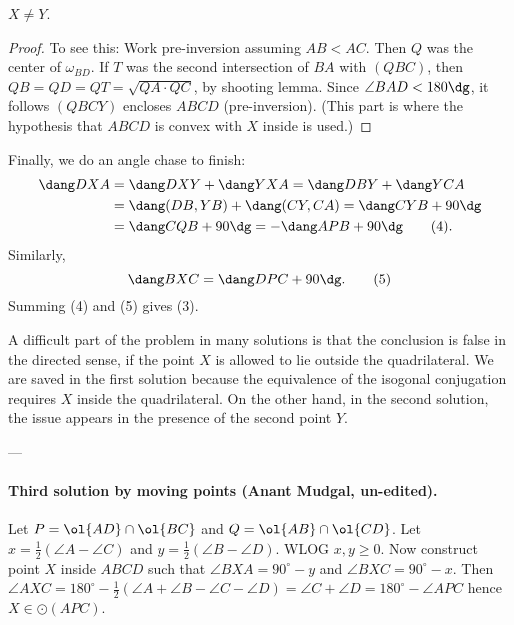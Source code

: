 \begin{claim*}
  $X \neq Y$.
\end{claim*}
\begin{proof}
  To see this: Work pre-inversion assuming $AB < AC$.
  Then $Q$ was the center of $\omega_{BD}$.
  If $T$ was the second intersection of $BA$ with $(QBC)$,
  then $QB = QD = QT = \sqrt{QA \cdot QC}$, by shooting lemma.
  Since $\angle BAD < 180\dg$,
  it follows $(QBCY)$ encloses $ABCD$ (pre-inversion).
  (This part is where the hypothesis that
  $ABCD$ is convex with $X$ inside is used.)
\end{proof}

Finally, we do an angle chase to finish:
\begin{align*}
  \dang DXA &= \dang DXY + \dang YXA = \dang DBY + \dang YCA \\
  &= \dang (DB, YB) + \dang (CY, CA) = \dang CYB + 90\dg \\
  &= \dang CQB + 90\dg = -\dang APB + 90\dg \tag{4}.
\end{align*}
Similarly,
\[ \dang BXC = \dang DPC + 90\dg. \tag{5} \]
Summing (4) and (5) gives (3).


\begin{remark*}
  A difficult part of the problem in many solutions
  is that the conclusion is false in the directed sense,
  if the point $X$ is allowed to lie outside the quadrilateral.
  We are saved in the first solution because the equivalence
  of the isogonal conjugation requires $X$ inside the quadrilateral.
  On the other hand, in the second solution,
  the issue appears in the presence of the second point $Y$.
\end{remark*}

---

\paragraph{Third solution by moving points (Anant Mudgal, un-edited).}
Let $P=\ol{AD} \cap \ol{BC}$ and $Q=\ol{AB} \cap \ol{CD}$. Let $x=\tfrac{1}{2}(\angle A-\angle C)$ and $y=\tfrac{1}{2}(\angle B-\angle D)$. WLOG $x,y \ge 0$. Now construct point $X$ inside $ABCD$ such that $\angle BXA=90^{\circ}-y$ and $\angle BXC=90^{\circ}-x$. Then $\angle AXC=180^{\circ}-\tfrac{1}{2}(\angle A+\angle B-\angle C-\angle D)=\angle C+\angle D=180^{\circ}-\angle APC$ hence $X \in \odot(APC)$.


